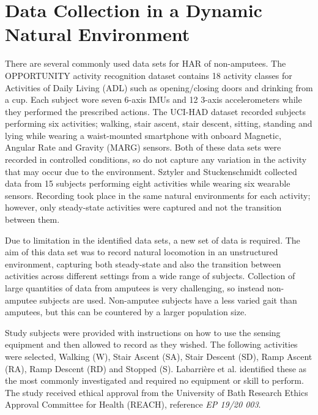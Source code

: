 \documentclass[sensors,article,submit,moreauthors,pdftex]{Definitions/mdpi}
\begin{document}
\section{Data Collection in a Dynamic Natural Environment}
\label{sec:data_collection}
There are several commonly used data sets for HAR of non-amputees. The OPPORTUNITY activity recognition dataset\cite{roggan2010} contains 18 activity classes for Activities of Daily Living (ADL) such as opening/closing doors and drinking from a cup. Each subject wore seven 6-axis IMUs and 12 3-axis accelerometers while they performed the prescribed actions. The UCI-HAD dataset\cite{Anguita2013} recorded subjects performing six activities; walking, stair ascent, stair descent, sitting, standing and lying while wearing a waist-mounted smartphone with onboard Magnetic, Angular Rate and Gravity (MARG) sensors. Both of these data sets were recorded in controlled conditions, so do not capture any variation in the activity that may occur due to the environment. Sztyler and Stuckenschmidt collected data from 15 subjects performing eight activities while wearing six wearable sensors. Recording took place in the same natural environments for each activity; however, only steady-state activities were captured and not the transition between them\cite{Sztyler2017}.

Due to limitation in the identified data sets, a new set of data is required. The aim of this data set was to record natural locomotion in an unstructured environment, capturing both steady-state and also the transition between activities across different settings from a wide range of subjects. Collection of large quantities of data from amputees is very challenging, so instead non-amputee subjects are used. Non-amputee subjects have a less varied gait than amputees, but this can be countered by a larger population size.

Study subjects were provided with instructions on how to use the sensing equipment and then allowed to record as they wished. The following activities were selected, Walking (W), Stair Ascent (SA), Stair Descent (SD), Ramp Ascent (RA), Ramp Descent (RD) and Stopped (S). Labarri\`ere et al. identified these as the most commonly investigated and required no equipment or skill to perform\cite{Labarriere2020}. The study received ethical approval from the University of Bath Research Ethics Approval Committee for Health (REACH), reference \textit{EP 19/20 003}.

\end{document}
